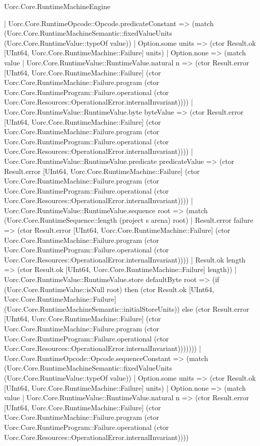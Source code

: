 \begin{lexlean}{Uorc.Core.RuntimeMachineEngine}
\begin{semanticmodule}
{          | Uorc.Core.RuntimeOpcode::Opcode.predicateConstant => (match (Uorc.Core.RuntimeMachineSemantic::fixedValueUnits (Uorc.Core.RuntimeValue::typeOf value))
            | Option.some units => (ctor Result.ok [UInt64, Uorc.Core.RuntimeMachine::Failure] units)
            | Option.none => (match value
              | Uorc.Core.RuntimeValue::RuntimeValue.natural n => (ctor Result.error [UInt64, Uorc.Core.RuntimeMachine::Failure] (ctor Uorc.Core.RuntimeMachine::Failure.program (ctor Uorc.Core.RuntimeProgram::Failure.operational (ctor Uorc.Core.Resources::OperationalError.internalInvariant))))
              | Uorc.Core.RuntimeValue::RuntimeValue.byte byteValue => (ctor Result.error [UInt64, Uorc.Core.RuntimeMachine::Failure] (ctor Uorc.Core.RuntimeMachine::Failure.program (ctor Uorc.Core.RuntimeProgram::Failure.operational (ctor Uorc.Core.Resources::OperationalError.internalInvariant))))
              | Uorc.Core.RuntimeValue::RuntimeValue.predicate predicateValue => (ctor Result.error [UInt64, Uorc.Core.RuntimeMachine::Failure] (ctor Uorc.Core.RuntimeMachine::Failure.program (ctor Uorc.Core.RuntimeProgram::Failure.operational (ctor Uorc.Core.Resources::OperationalError.internalInvariant))))
              | Uorc.Core.RuntimeValue::RuntimeValue.sequence root => (match (Uorc.Core.RuntimeSequence::length (project s arena) root)
                | Result.error failure => (ctor Result.error [UInt64, Uorc.Core.RuntimeMachine::Failure] (ctor Uorc.Core.RuntimeMachine::Failure.program (ctor Uorc.Core.RuntimeProgram::Failure.operational (ctor Uorc.Core.Resources::OperationalError.internalInvariant))))
                | Result.ok length => (ctor Result.ok [UInt64, Uorc.Core.RuntimeMachine::Failure] length))
              | Uorc.Core.RuntimeValue::RuntimeValue.store defaultByte root => (if (Uorc.Core.RuntimeValue::isNull root) then (ctor Result.ok [UInt64, Uorc.Core.RuntimeMachine::Failure] (Uorc.Core.RuntimeMachineSemantic::initialStoreUnits)) else (ctor Result.error [UInt64, Uorc.Core.RuntimeMachine::Failure] (ctor Uorc.Core.RuntimeMachine::Failure.program (ctor Uorc.Core.RuntimeProgram::Failure.operational (ctor Uorc.Core.Resources::OperationalError.internalInvariant)))))))
          | Uorc.Core.RuntimeOpcode::Opcode.sequenceConstant => (match (Uorc.Core.RuntimeMachineSemantic::fixedValueUnits (Uorc.Core.RuntimeValue::typeOf value))
            | Option.some units => (ctor Result.ok [UInt64, Uorc.Core.RuntimeMachine::Failure] units)
            | Option.none => (match value
              | Uorc.Core.RuntimeValue::RuntimeValue.natural n => (ctor Result.error [UInt64, Uorc.Core.RuntimeMachine::Failure] (ctor Uorc.Core.RuntimeMachine::Failure.program (ctor Uorc.Core.RuntimeProgram::Failure.operational (ctor Uorc.Core.Resources::OperationalError.internalInvariant))))
}
\end{semanticmodule}
\end{lexlean}
